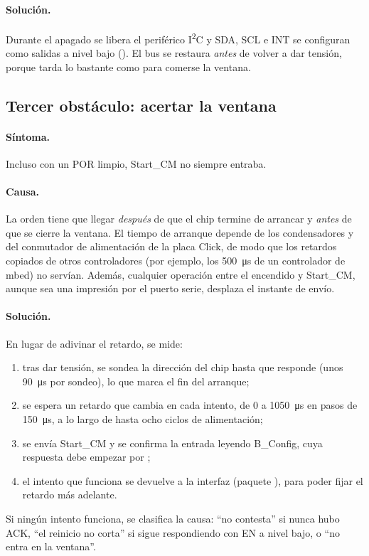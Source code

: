 \paragraph{Solución.} Durante el apagado se libera el periférico I\textsuperscript{2}C y SDA, SCL e
INT se configuran como salidas a nivel bajo (). El bus se restaura
\emph{antes} de volver a dar tensión, porque  tarda lo bastante como para comerse
la ventana.

\subsection{Tercer obstáculo: acertar la ventana}

\paragraph{Síntoma.} Incluso con un POR limpio, Start\_CM no siempre entraba.

\paragraph{Causa.} La orden tiene que llegar \emph{después} de que el chip termine de arrancar y
\emph{antes} de que se cierre la ventana. El tiempo de arranque depende de los condensadores y del
conmutador de alimentación de la placa Click, de modo que los retardos copiados de otros controladores
(por ejemplo, los \SI{500}{\micro\second} de un controlador de mbed) no servían. Además, cualquier
operación entre el encendido y Start\_CM, aunque sea una impresión por el puerto serie, desplaza el
instante de envío.

\paragraph{Solución.} En lugar de adivinar el retardo, se mide:
\begin{enumerate}
  \item tras dar tensión, se sondea la dirección del chip hasta que responde (unos
        \SI{90}{\micro\second} por sondeo), lo que marca el fin del arranque;
  \item se espera un retardo que cambia en cada intento, de \num{0} a \SI{1050}{\micro\second} en
        pasos de \SI{150}{\micro\second}, a lo largo de hasta ocho ciclos de alimentación;
  \item se envía Start\_CM y se confirma la entrada leyendo B\_Config, cuya respuesta debe empezar por
        ;
  \item el intento que funciona se devuelve a la interfaz (paquete ), para poder fijar el
        retardo más adelante.
\end{enumerate}
Si ningún intento funciona, se clasifica la causa: ``no contesta'' si nunca hubo ACK, ``el reinicio no
corta'' si sigue respondiendo con EN a nivel bajo, o ``no entra en la ventana''.

